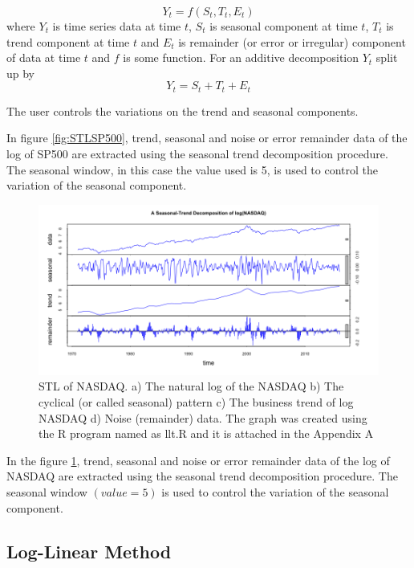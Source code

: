 \begin{equation}
Y_t = f(S_t,T_t,E_t)
\end{equation} where $Y_t$ is time series data at time $t$, $S_t$ is seasonal component at time $t$, $T_t$ is trend component at time $t$ and $E_t$ is remainder (or error or irregular) component of data at time $t$ and $f$ is some function. For an additive decomposition $Y_t$ split up by
\begin{equation}
Y_t = S_t+T_t+E_t
\end{equation}

The user controls the variations on the trend and seasonal components.

In figure \ref{fig:STLSP500}, trend, seasonal and noise or error remainder data of the log of SP500 are extracted using the seasonal trend decomposition procedure. The seasonal window, in this case the value used is 5, is used to control the variation of the seasonal component. 


\begin{figure}[!ht]
\centering
\includegraphics[scale=.5]{Images/STLNASDAQ}
\caption{STL of NASDAQ. a) The natural log of the NASDAQ b) The cyclical (or called seasonal) pattern c) The business trend of log NASDAQ d) Noise (remainder) data. The graph was created using the R program named as llt.R and it is attached in the Appendix A}
\label{fig:STLNASDAQ}
\end{figure}

In the figure \ref{fig:STLNASDAQ}, trend, seasonal and noise or error remainder data of the log of NASDAQ are extracted using the seasonal trend decomposition procedure. The seasonal window $(value = 5)$ is used to control the variation of the seasonal component. 

\subsection{Log-Linear Method}

